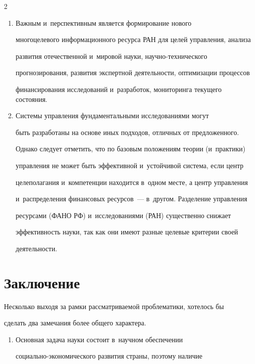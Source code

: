 \begin{multicols}{2}
\begin{enumerate}[1.]
\begin{itemize}
\end{itemize}

    \item  Важным и~перспективным является формирование нового 

многоцелевого информационного ресурса РАН для целей управления, анализа 

развития отечественной и~мировой науки, на\-уч\-но-тех\-ни\-че\-ско\-го 

прогнозирования, развития экспертной деятельности, оптимизации процессов 

финансирования исследований и~разработок, мониторинга текущего состояния.

    \item  Системы управления фундаментальными исследованиями могут 

быть разработаны на основе иных подходов, отличных от предложенного. 

Однако следует отметить, что по базовым положениям теории (и~практики) 

управления не может быть эффективной и~устойчивой система, если центр 

целеполагания и~компетенции находится в~одном месте, а центр управления 

и~распределения финансовых ресурсов~--- в~другом. Разделение управления 

ресурсами (\mbox{ФАНО} РФ) и~исследованиями (РАН) существенно снижает 

эффективность науки, так как они имеют разные целевые критерии своей 

деятельности.

    \end{enumerate}

    

    \section{Заключение}

    

    Несколько выходя за рамки рассматриваемой проблематики, хотелось бы 

сделать два замечания более общего характера.

    \begin{enumerate}[1.]

    \item  Основная задача науки состоит в~научном обеспечении  

со\-ци\-аль\-но-эко\-но\-ми\-че\-ско\-го развития страны, поэтому наличие 


\end{enumerate}
\end{multicols}
